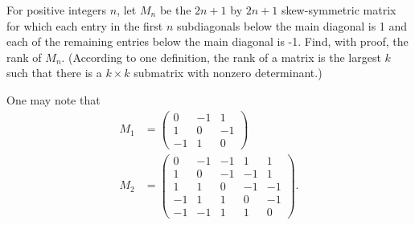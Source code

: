 For positive integers $n$, let $M_n$ be the $2n+1$ by $2n+1$
skew-symmetric matrix for which each entry in the first $n$
subdiagonals below the main diagonal is 1 and each of the remaining
entries below the main diagonal is -1. Find, with proof, the rank of
$M_n$. (According to one definition, the rank of a matrix is the
largest $k$ such that there is a $k \times k$ submatrix with nonzero
determinant.)

One may note that
\begin{align*}
M_1 &= \left( \begin{array}{ccc} 0 & -1 & 1 \\ 1 & 0 & -1 \\ -1 & 1 & 0
\end{array}\right) \\
M_2 &= \left( \begin{array}{ccccc} 0 & -1 & -1 & 1
& 1 \\ 1 & 0 & -1 & -1 & 1 \\ 1 & 1 & 0 & -1 & -1 \\ -1 & 1 & 1 & 0 &
-1 \\ -1 & -1 & 1 & 1 & 0 \end{array} \right).
\end{align*}
